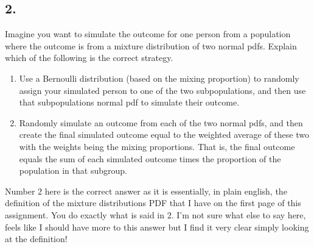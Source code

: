 \subsection*{2.}

Imagine you want to simulate the outcome for one person from a population where the outcome is from a mixture distribution of two normal pdfs. Explain which of the following is the correct strategy.

\begin{enumerate}
	\item Use a Bernoulli distribution (based on the mixing proportion) to randomly assign your simulated person to one of the two subpopulations, and then use that subpopulations normal pdf to simulate their outcome.
	\item Randomly simulate an outcome from each of the two normal pdfs, and then create the final simulated outcome equal to the weighted average of these two with the weights being the mixing proportions. That is, the final outcome equals the sum of each simulated outcome times the proportion of the population in that subgroup.
\end{enumerate}

Number 2 here is the correct answer as it is essentially, in plain english, the definition of the mixture distributions PDF that I have on the first page of this assignment. You do exactly what is said in 2. I'm not sure what else to say here, feels like I should have more to this answer but I find it very clear simply looking at the definition!


